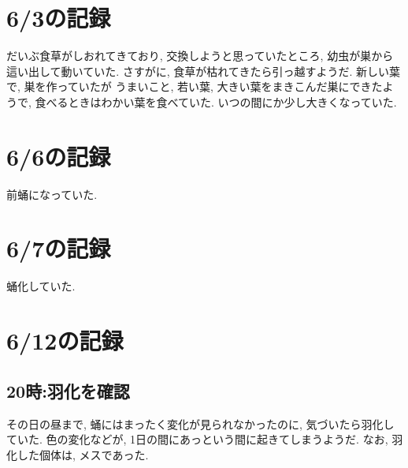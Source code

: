 \documentclass{jsarticle}
\begin{document}
\section{6/3の記録}
だいぶ食草がしおれてきており, 交換しようと思っていたところ, 幼虫が巣から這い出して動いていた. 
さすがに, 食草が枯れてきたら引っ越すようだ. 
新しい葉で, 巣を作っていたが うまいこと, 若い葉, 大きい葉をまきこんだ巣にできたようで, 
食べるときはわかい葉を食べていた. いつの間にか少し大きくなっていた. 

\section{6/6の記録}
前蛹になっていた. 

\section{6/7の記録}
蛹化していた.

\section{6/12の記録}
\subsection{20時:羽化を確認}
その日の昼まで, 蛹にはまったく変化が見られなかったのに, 気づいたら羽化していた. 
色の変化などが, 1日の間にあっという間に起きてしまうようだ. 
なお, 羽化した個体は, メスであった. 
\end{document}
